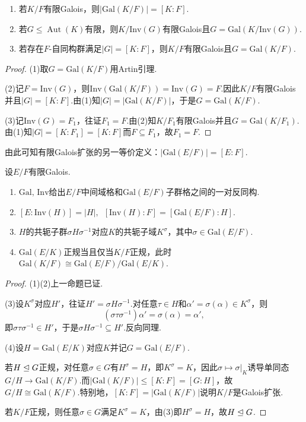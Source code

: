 \begin{prop}
    \begin{enumerate}
        \item 若$K/F$有限Galois，则$|\mathrm{Gal}(K/F)|=[K:F]$.
        \item 若$G\le\operatorname*{Aut}(K)$有限，则$K/\mathrm{Inv}(G)$有限Galois且$G=\mathrm{Gal}(K/\mathrm{Inv}(G))$.
        \item 若存在$F$-自同构群满足$|G|=[K:F]$，则$K/F$有限Galois且$G=\mathrm{Gal}(K/F)$.
    \end{enumerate}
\end{prop}
\begin{proof}
    \hspace*{5.2pt}(1)取$G=\mathrm{Gal}(K/F)$用Artin引理.
    
    (2)记$F=\mathrm{Inv}(G)$，则$\mathrm{Inv}(\mathrm{Gal}(K/F))=\mathrm{Inv}(G)=F$.因此$K/F$有限Galois并且$|G|=[K:F]$.由(1)知$|G|=|\mathrm{Gal}(K/F)|$，于是$G=\mathrm{Gal}(K/F)$.

    (3)记$\mathrm{Inv}(G)=F_1$，往证$F_1=F$.由(2)知$K/F_1$有限Galois并且$G=\mathrm{Gal}(K/F_1)$.由(1)知$|G|=[K:F_1]=[K:F]$而$F\subseteq F_1$，故$F_1=F$.
\end{proof}
\begin{remark}
    由此可知有限Galois扩张的另一等价定义：$|\mathrm{Gal}(E/F)|=[E:F]$.
\end{remark}
\begin{thm}[(Galois基本定理)]
    设$E/F$有限Galois.
    \begin{enumerate}
        \item $\mathrm{Gal},\,\mathrm{Inv}$给出$E/F$中间域格和$\mathrm{Gal}(E/F)$子群格之间的一对反同构.
        \item $[E:\mathrm{Inv}(H)]=|H|,\enspace[\mathrm{Inv}(H):F]=[\mathrm{Gal}(E/F):H]$.
        \item $H$的共轭子群$\sigma H\sigma^{-1}$对应$K$的共轭子域$K^\sigma$，其中$\sigma\in\mathrm{Gal}(E/F)$.
        \item $\mathrm{Gal}(E/K)$正规当且仅当$K/F$正规，此时$\mathrm{Gal}(K/F)\cong \mathrm{Gal}(E/F)/\mathrm{Gal}(E/K)$.
    \end{enumerate}
\end{thm}
\begin{proof}
    \hspace*{5.2pt}(1)(2)上一命题已证.
    
    (3)设$K^\sigma$对应$H'$，往证$H'=\sigma H\sigma^{-1}$.对任意$\tau\in H$和$\alpha'=\sigma(\alpha)\in K^\sigma$，则
    \[
        (\sigma\tau\sigma^{-1})\alpha'=\sigma(\alpha)=\alpha',
    \]
    即$\sigma\tau\sigma^{-1}\in H'$，于是$\sigma H\sigma^{-1}\subseteq H'$.反向同理.

    (4)设$H=\mathrm{Gal}(E/K)$对应$K$并记$G=\mathrm{Gal}(E/F)$.
    
    若$H\trianglelefteq G$正规，对任意$\sigma\in G$有$H^\sigma=H$，即$K^\sigma=K$，因此$\sigma\mapsto\sigma|_K$诱导单同态$G/H\to\mathrm{Gal}(K/F)$.而$|\mathrm{Gal}(K/F)|\le[K:F]=[G:H]$，故$G/H\cong\mathrm{Gal}(K/F)$.特别地，$[K:F]=|\mathrm{Gal}(K/F)|$说明$K/F$是Galois扩张.

    若$K/F$正规，则任意$\sigma\in G$满足$K^\sigma=K$，由(3)即$H^\sigma=H$，故$H\trianglelefteq G$.
\end{proof}
